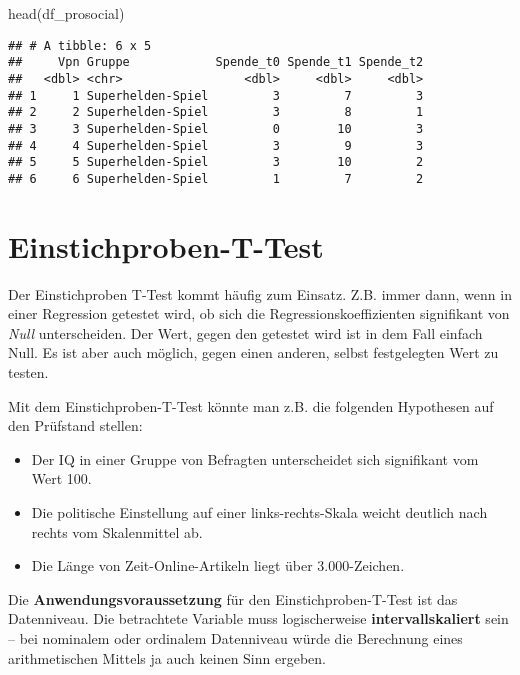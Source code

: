\documentclass[
]{book}
\newenvironment{Shaded}{\begin{snugshade}}{\end{snugshade}}
\newcommand{\FunctionTok}[1]{\textcolor[rgb]{0.00,0.00,0.00}{#1}}
\newcommand{\NormalTok}[1]{#1}
\begin{document}
\begin{Shaded}
\begin{Highlighting}[]
\FunctionTok{head}\NormalTok{(df\_prosocial)}
\end{Highlighting}
\end{Shaded}

\begin{verbatim}
## # A tibble: 6 x 5
##     Vpn Gruppe            Spende_t0 Spende_t1 Spende_t2
##   <dbl> <chr>                 <dbl>     <dbl>     <dbl>
## 1     1 Superhelden-Spiel         3         7         3
## 2     2 Superhelden-Spiel         3         8         1
## 3     3 Superhelden-Spiel         0        10         3
## 4     4 Superhelden-Spiel         3         9         3
## 5     5 Superhelden-Spiel         3        10         2
## 6     6 Superhelden-Spiel         1         7         2
\end{verbatim}

\hypertarget{einstichproben-t-test}{%
\section{Einstichproben-T-Test}\label{einstichproben-t-test}}

Der Einstichproben T-Test kommt häufig zum Einsatz. Z.B. immer dann, wenn in einer Regression getestet wird, ob sich die Regressionskoeffizienten signifikant von \emph{Null} unterscheiden.
Der Wert, gegen den getestet wird ist in dem Fall einfach Null.
Es ist aber auch möglich, gegen einen anderen, selbst festgelegten Wert zu testen.

Mit dem Einstichproben-T-Test könnte man z.B. die folgenden Hypothesen auf den Prüfstand stellen:

\begin{itemize}
\item
  Der IQ in einer Gruppe von Befragten unterscheidet sich signifikant vom Wert 100.
\item
  Die politische Einstellung auf einer links-rechts-Skala weicht deutlich nach rechts vom Skalenmittel ab.
\item
  Die Länge von Zeit-Online-Artikeln liegt über 3.000-Zeichen.
\end{itemize}

Die \textbf{Anwendungsvoraussetzung} für den Einstichproben-T-Test ist das Datenniveau. Die betrachtete Variable muss logischerweise \textbf{intervallskaliert} sein -- bei nominalem oder ordinalem Datenniveau würde die Berechnung eines arithmetischen Mittels ja auch keinen Sinn ergeben.
\end{document}
